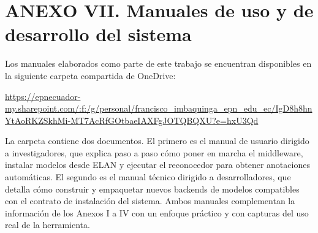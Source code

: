 \documentclass[11pt,a4paper]{article}
\begin{document}
\section*{\normalfont ANEXO VII. Manuales de uso y de desarrollo del sistema}
\label{anx:manuales}

Los manuales elaborados como parte de este trabajo se encuentran disponibles en la siguiente carpeta compartida de OneDrive:

\begin{center}
\url{https://epnecuador-my.sharepoint.com/:f:/g/personal/francisco_imbaquinga_epn_edu_ec/IgD8h8hnYtAoRKZSkhMi-MT7AcRfGOtbaeIAXFgJOTQBQXU?e=hxU3Qd}
\end{center}

La carpeta contiene dos documentos. El primero es el manual de usuario dirigido a investigadores, que explica paso a paso cómo poner en marcha el middleware, instalar modelos desde ELAN y ejecutar el reconocedor para obtener anotaciones automáticas. El segundo es el manual técnico dirigido a desarrolladores, que detalla cómo construir y empaquetar nuevos backends de modelos compatibles con el contrato de instalación del sistema. Ambos manuales complementan la información de los Anexos I a IV con un enfoque práctico y con capturas del uso real de la herramienta.
\end{document}
